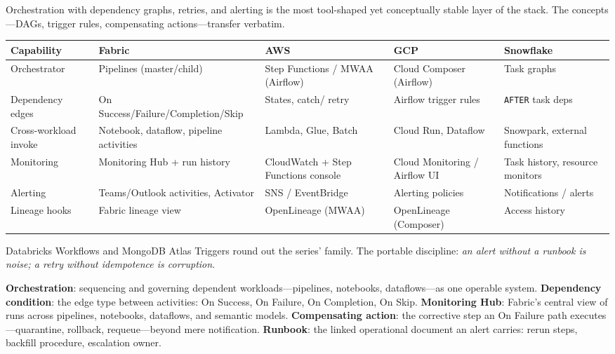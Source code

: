 \begin{crosscloud}
Orchestration with dependency graphs, retries, and alerting is the most tool-shaped yet conceptually stable layer of the stack. The concepts---DAGs, trigger rules, compensating actions---transfer verbatim.

\vspace{2mm}
{\footnotesize
\begin{tabular}{@{}p{2.8cm}p{3.2cm}p{3.2cm}p{3.2cm}p{3.2cm}@{}}
\toprule
\textbf{Capability} & \textbf{Fabric} & \textbf{AWS} & \textbf{GCP} & \textbf{Snowflake} \\
\midrule
Orchestrator & Pipelines (master/child) & Step Functions / MWAA (Airflow) & Cloud Composer (Airflow) & Task graphs \\
Dependency edges & On Success/Failure/Completion/Skip & States, catch/ retry & Airflow trigger rules & \texttt{AFTER} task deps \\
Cross-workload invoke & Notebook, dataflow, pipeline activities & Lambda, Glue, Batch & Cloud Run, Dataflow & Snowpark, external functions \\
Monitoring & Monitoring Hub + run history & CloudWatch + Step Functions console & Cloud Monitoring / Airflow UI & Task history, resource monitors \\
Alerting & Teams/Outlook activities, Activator & SNS / EventBridge & Alerting policies & Notifications / alerts \\
Lineage hooks & Fabric lineage view & OpenLineage (MWAA) & OpenLineage (Composer) & Access history \\
\bottomrule
\end{tabular}}

\vspace{1mm}
Databricks Workflows and MongoDB Atlas Triggers round out the series' family. The portable discipline: \emph{an alert without a runbook is noise; a retry without idempotence is corruption}.
\end{crosscloud}

\begin{keyterms}
\textbf{Orchestration}: sequencing and governing dependent workloads---pipelines, notebooks, dataflows---as one operable system. \quad
\textbf{Dependency condition}: the edge type between activities: On Success, On Failure, On Completion, On Skip. \quad
\textbf{Monitoring Hub}: Fabric's central view of runs across pipelines, notebooks, dataflows, and semantic models. \quad
\textbf{Compensating action}: the corrective step an On Failure path executes---quarantine, rollback, requeue---beyond mere notification. \quad
\textbf{Runbook}: the linked operational document an alert carries: rerun steps, backfill procedure, escalation owner.
\end{keyterms}

